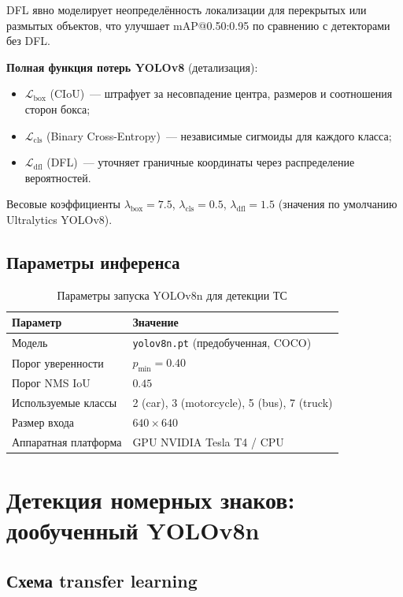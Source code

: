 \documentclass[14pt,a4paper]{report}
\numberwithin{equation}{chapter}
\numberwithin{figure}{chapter}
\numberwithin{table}{chapter}
\begin{document}
DFL явно моделирует неопределённость локализации для
перекрытых или размытых объектов, что улучшает mAP@0.50:0.95
по сравнению с детекторами без DFL.

\textbf{Полная функция потерь YOLOv8} (детализация):
\begin{itemize}[nosep]
  \item $\mathcal{L}_{\mathrm{box}}$ (CIoU)~--- штрафует
    за несовпадение центра, размеров и соотношения сторон бокса;
  \item $\mathcal{L}_{\mathrm{cls}}$ (Binary Cross-Entropy)~---
    независимые сигмоиды для каждого класса;
  \item $\mathcal{L}_{\mathrm{dfl}}$ (DFL)~--- уточняет
    граничные координаты через распределение вероятностей.
\end{itemize}

Весовые коэффициенты $\lambda_{\mathrm{box}}=7.5$,
$\lambda_{\mathrm{cls}}=0.5$, $\lambda_{\mathrm{dfl}}=1.5$
(значения по умолчанию Ultralytics YOLOv8).

\subsection{Параметры инференса}

\begin{table}[H]
\centering
\caption{Параметры запуска YOLOv8n для детекции ТС}
\label{tab:yolo_params}
\begin{tabularx}{\textwidth}{lX}
\toprule
\textbf{Параметр} & \textbf{Значение} \\
\midrule
Модель                  & \texttt{yolov8n.pt} (предобученная, COCO) \\
Порог уверенности       & $p_{\min} = 0.40$ \\
Порог NMS IoU           & $0.45$ \\
Используемые классы     & 2 (car), 3 (motorcycle), 5 (bus), 7 (truck) \\
Размер входа            & $640 \times 640$ \\
Аппаратная платформа    & GPU NVIDIA Tesla T4 / CPU \\
\bottomrule
\end{tabularx}
\end{table}

\section{Детекция номерных знаков: дообученный YOLOv8n}

\subsection{Схема transfer learning}
\end{document}
